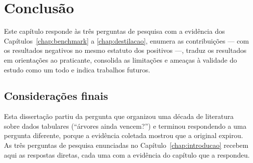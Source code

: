 
\chapter{Conclusão}
\label{chap:conclusao}

Este capítulo responde às três perguntas de pesquisa com a evidência
dos Capítulos~\ref{chap:benchmark} a \ref{chap:destilacao}, enumera
as contribuições --- com os resultados negativos no mesmo estatuto dos
positivos ---, traduz os resultados em orientações ao praticante,
consolida as limitações e ameaças à validade do estudo como um todo e
indica trabalhos futuros.

\section{Considerações finais}
\label{sec:conc-finais}

Esta dissertação partiu da pergunta que organizou uma década de
literatura sobre dados tabulares (``árvores ainda vencem?'') e
terminou respondendo a uma pergunta diferente, porque a evidência
coletada mostrou que a original expirou. As três perguntas de pesquisa
enunciadas no Capítulo~\ref{chap:introducao} recebem aqui as respostas
diretas, cada uma com a evidência do capítulo que a respondeu.

